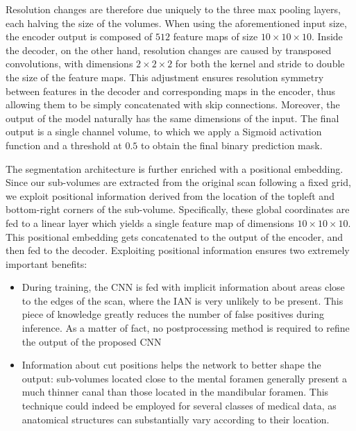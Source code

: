 Resolution changes are therefore due uniquely to the
three max pooling layers, each halving the size of the
volumes. When using the aforementioned input size, the
encoder output is composed of $512$ feature maps of size
$10 \times 10 \times 10$. Inside the decoder, on the other hand, resolution changes are caused by transposed convolutions, with
dimensions $2 \times 2 \times 2$ for both the kernel and stride to double the size of the feature maps. This adjustment ensures
resolution symmetry between features in the decoder and
corresponding maps in the encoder, thus allowing them to
be simply concatenated with skip connections. Moreover,
the output of the model naturally has the same dimensions
of the input. The final output is a single channel volume, to
which we apply a Sigmoid activation function and a threshold at $0.5$ to obtain the final binary prediction mask.

The segmentation architecture is further enriched with a
positional embedding. Since our sub-volumes are extracted
from the original scan following a fixed grid, we exploit
positional information derived from the location of the topleft and bottom-right corners of the sub-volume. Specifically, these global coordinates are fed to a linear layer which
yields a single feature map of dimensions $10 \times 10 \times 10$. This
positional embedding gets concatenated to the output of the
encoder, and then fed to the decoder. Exploiting positional
information ensures two extremely important benefits:
\begin{itemize}
  \item{During training, the CNN is fed with implicit information about areas
  close to the edges of the scan, where the IAN is very unlikely to be present.
  This piece of knowledge greatly reduces the number of false positives during
  inference. As a matter of fact, no postprocessing method is required to refine
  the output of the proposed CNN}
  \item{Information about cut positions helps the network to better shape the
  output: sub-volumes located close to the mental foramen generally present a
  much thinner canal than those located in the mandibular foramen. This
  technique could indeed be employed for several classes of medical data, as
  anatomical structures can substantially vary according to their location.}
\end{itemize}

